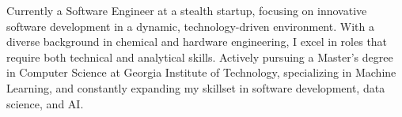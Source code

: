 

\begin{cvparagraph}

Currently a Software Engineer at a stealth startup, focusing on innovative software development in a dynamic, technology-driven environment. With a diverse background in chemical and hardware engineering, I excel in roles that require both technical and analytical skills. Actively pursuing a Master's degree in Computer Science at Georgia Institute of Technology, specializing in Machine Learning, and constantly expanding my skillset in software development, data science, and AI.

\end{cvparagraph}
